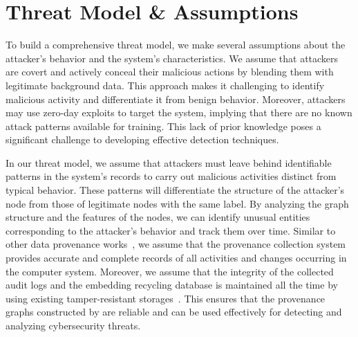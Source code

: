 
\section{Threat Model \& Assumptions}

To build a comprehensive threat model, we make several assumptions about the attacker's behavior and the system's characteristics. We assume that attackers are covert and actively conceal their malicious actions by blending them with legitimate background data. This approach makes it challenging to identify malicious activity and differentiate it from benign behavior. Moreover, attackers may use zero-day exploits to target the system, implying that there are no known attack patterns available for training. This lack of prior knowledge poses a significant challenge to developing effective detection techniques.

In our threat model, we assume that attackers must leave behind identifiable patterns in the system's records to carry out malicious activities distinct from typical behavior. These patterns will differentiate the structure of the attacker's node from those of legitimate nodes with the same label. By analyzing the graph structure and the features of the nodes, we can identify unusual entities corresponding to the attacker's behavior and track them over time. Similar to other data provenance works~\cite{nodoze2019,priotracker2018,mzx2016,bates2017transparent}, we assume that the provenance collection system provides accurate and complete records of all activities and changes occurring in the computer system. Moreover, we assume that the integrity of the collected audit logs and the embedding recycling database is maintained all the time by using existing tamper-resistant storages~\cite{paccagnella2020custos,hardlog}. This ensures that the provenance graphs constructed by \Sys are reliable and can be used effectively for detecting and analyzing cybersecurity threats.


